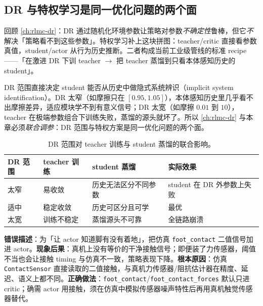 \subsection{DR 与特权学习是同一优化问题的两个面}
\label{sec:rlmc-priv-dr}

回顾 \cref{ch:rlmc-dr}：DR 通过随机化环境参数让策略对参数\emph{不确定性}鲁棒，但它\emph{不}解决「策略看不到这些参数」。特权学习补上这块拼图：teacher/critic 直接看参数真值，student/actor 从行为历史推断。二者构成当前工业级管线的标准 recipe——「在激进 DR 下训 teacher $\to$ 把 teacher 蒸馏到只看本体感知历史的 student」。

\begin{insight}\label{ins:rlmc-priv-drsysid}
DR 范围直接决定 student 能否从历史中做隐式系统辨识（implicit system identification）。DR 太窄（如摩擦只在 $[0.95,1.05]$），本体感知历史里几乎看不出摩擦差异，适应模块学不到有意义信号；DR 太宽（如摩擦 $0.01$ 到 $10$），teacher 在极端参数组合下训练失败，蒸馏的源头就坏了。所以 \cref{ch:rlmc-dr} 与本章必须\emph{联合调参}：DR 范围与特权方案是同一优化问题的两个面。
\end{insight}

\begin{table}[H]
\centering
\small
\caption{DR 范围对 teacher 训练与 student 蒸馏的联合影响。}
\label{tab:rlmc-priv-drrange}
\begin{tabular}{@{}llll@{}}
\toprule
DR 范围 & teacher 训练 & student 蒸馏 & 实际效果 \\
\midrule
太窄 & 易收敛 & 历史无法区分不同参数 & student 在 DR 外参数上失败 \\
适中 & 稳定收敛 & 历史可区分且可学 & 最优 \\
太宽 & 训练不稳定 & 蒸馏源头不可靠 & 全链路崩溃 \\
\bottomrule
\end{tabular}
\end{table}

\begin{pitfall}
\textbf{错误描述}：为「让 actor 知道脚有没有着地」，把仿真 \verb|foot_contact| 二值信号加进 actor。\textbf{现象后果}：真机上没有等价的干净接触信号；即便装了力传感器，阈值不当也会让接触 timing 与仿真不一致，策略表现下降。\textbf{根本原因}：仿真 \verb|ContactSensor| 直接读取的二值接触，与真机力传感器/阻抗估计器在精度、延迟、语义上都不同。\textbf{正确做法}：\verb|foot_contact|/\verb|foot_contact_forces| 默认只进 critic；确需 actor 用接触，须在仿真中模拟传感器噪声特性后再用真机触觉传感器替代。
\end{pitfall}

